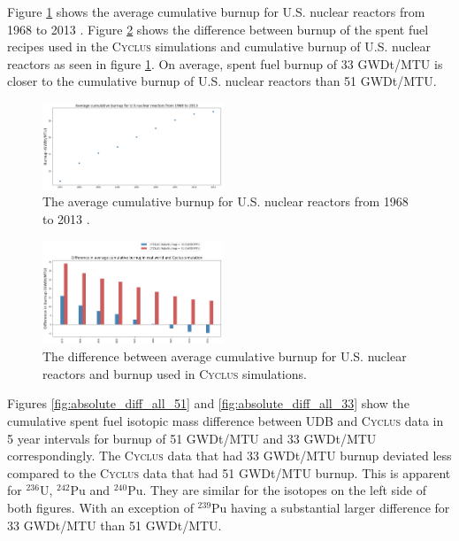 \documentclass{anstrans}
\newcommand{\Cyclus}{\textsc{Cyclus}\xspace}%
\begin{document}
Figure \ref{fig:burn_up_real} shows the average cumulative burnup for U.S. 
nuclear reactors from 1968 to 2013 \cite{eia_spent_2015}. Figure 
\ref{fig:burn_up_difference} shows the difference between burnup of the spent 
fuel recipes used in the \Cyclus simulations and cumulative burnup of U.S. 
nuclear reactors as seen in figure \ref{fig:burn_up_real}. On average, spent 
fuel burnup of 33 GWDt/MTU is closer to the cumulative burnup of U.S. nuclear 
reactors than 51 GWDt/MTU. 

\begin{figure}[t] %
	\centering
	\includegraphics[width=0.48\textwidth]{figures/burn_up_real}
	\caption{The average cumulative burnup for U.S. nuclear reactors from 1968 to 2013 \cite{eia_spent_2015}.}
	\label{fig:burn_up_real}
\end{figure} 

\begin{figure}[t] %
	\centering
	\includegraphics[width=0.48\textwidth]{figures/burn_up_difference}
	\caption{The difference between average cumulative burnup for U.S. nuclear reactors and burnup used in \Cyclus simulations.}
	\label{fig:burn_up_difference}
\end{figure} 

Figures \ref{fig:absolute_diff_all_51} and \ref{fig:absolute_diff_all_33} show 
the cumulative spent fuel isotopic mass difference between UDB and \Cyclus data 
in 5 year intervals for burnup of 51 GWDt/MTU and 33 GWDt/MTU correspondingly. 
The \Cyclus data that had 33 GWDt/MTU burnup deviated less compared to the 
\Cyclus data that had 51 GWDt/MTU burnup. This is apparent for $^{236}$U, 
$^{242}$Pu and $^{240}$Pu. They are similar for the isotopes on the left side 
of both figures. With an exception of $^{239}$Pu having a substantial larger 
difference for 33 GWDt/MTU than 51 GWDt/MTU. 
\end{document}
